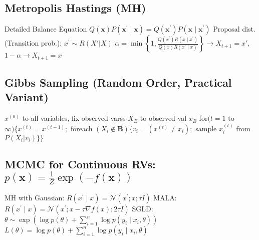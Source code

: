 \documentclass[a4paper, 11pt, landscape]{article}
\begin{document}
\begin{multicols*}{3}
\subsection{Metropolis Hastings (MH)}
Detailed Balance Equation $Q(\mathbf{x}) P\left(\mathbf{x}^{\prime} \mid \mathbf{x}\right)=Q\left(\mathbf{x}^{\prime}\right) P\left(\mathbf{x} \mid \mathbf{x}^{\prime}\right)$
\newline Proposal dist. (Transition prob.): $x^{\prime}\sim R(X' | X)$
\newline $\alpha=\min \left\{1, \frac{Q\left(x^{\prime}\right) R\left(x \mid x^{\prime}\right)}{Q(x) R\left(x^{\prime} \mid x\right)}\right\} \rightarrow X_{t+1} = x'$, \space\space $1-\alpha \rightarrow X_{t+1} = x$

\subsection{Gibbs Sampling (Random Order, Practical Variant)}
$x^{(0)}$ to all variables, fix observed varss $X_B$ to observed val $x_B$
\newline for$(t=1$ to $\infty)\{x^{(t)} = x^{(t-1)};$ 
\newline foreach $(X_i \notin \mathbf{B})\{v_i = (x^{(t)} \neq x_i);$ sample $x^{(t)}_i$ from $P(X_i | v_i)\}\}$

\subsection{MCMC for Continuous RVs: $p(\mathbf{x})=\frac{1}{Z} \exp (-f(\mathbf{x}))$}
MH with Gaussian: $R\left(x^{\prime} \mid x\right)=\mathcal{N}\left(x^{\prime} ; x ; \tau I\right)$
\newline MALA: $R\left(x^{\prime} \mid x\right)=\mathcal{N}\left(x^{\prime} ; x-\tau \nabla f(x) ; 2 \tau I\right)$
\newline SGLD: $\theta \sim \exp \left(\log p(\theta)+\sum_{i=1}^{n} \log p\left(y_{i} \mid x_{i}, \theta\right)\right)$
\newline $L(\theta) = \log p(\theta)+\sum_{i=1}^{n} \log p\left(y_{i} \mid x_{i}, \theta\right)$


\end{multicols*}
\end{document}
